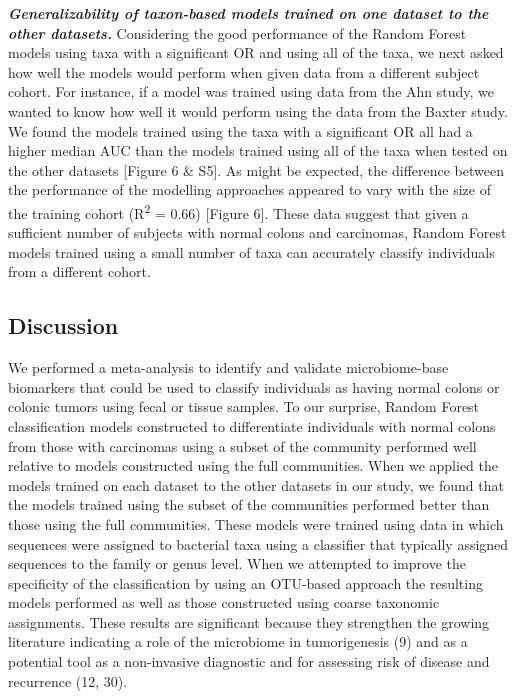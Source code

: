 \documentclass[12pt,]{article}
\begin{document}
\textbf{\emph{Generalizability of taxon-based models trained on one
dataset to the other datasets.}} Considering the good performance of the
Random Forest models using taxa with a significant OR and using all of
the taxa, we next asked how well the models would perform when given
data from a different subject cohort. For instance, if a model was
trained using data from the Ahn study, we wanted to know how well it
would perform using the data from the Baxter study. We found the models
trained using the taxa with a significant OR all had a higher median AUC
than the models trained using all of the taxa when tested on the other
datasets {[}Figure 6 \& S5{]}. As might be expected, the difference
between the performance of the modelling approaches appeared to vary
with the size of the training cohort (R\textsuperscript{2} = 0.66)
{[}Figure 6{]}. These data suggest that given a sufficient number of
subjects with normal colons and carcinomas, Random Forest models trained
using a small number of taxa can accurately classify individuals from a
different cohort.

\newpage

\subsection{Discussion}\label{discussion}

We performed a meta-analysis to identify and validate microbiome-base
biomarkers that could be used to classify individuals as having normal
colons or colonic tumors using fecal or tissue samples. To our surprise,
Random Forest classification models constructed to differentiate
individuals with normal colons from those with carcinomas using a subset
of the community performed well relative to models constructed using the
full communities. When we applied the models trained on each dataset to
the other datasets in our study, we found that the models trained using
the subset of the communities performed better than those using the full
communities. These models were trained using data in which sequences
were assigned to bacterial taxa using a classifier that typically
assigned sequences to the family or genus level. When we attempted to
improve the specificity of the classification by using an OTU-based
approach the resulting models performed as well as those constructed
using coarse taxonomic assignments. These results are significant
because they strengthen the growing literature indicating a role of the
microbiome in tumorigenesis (9) and as a potential tool as a
non-invasive diagnostic and for assessing risk of disease and recurrence
(12, 30).
\end{document}
